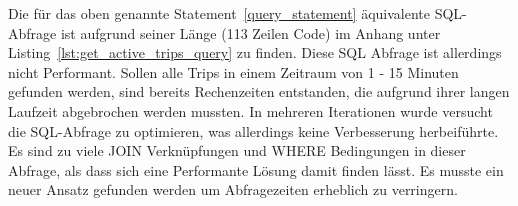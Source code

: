   Die für das oben genannte Statement~\ref{query_statement} äquivalente SQL-Abfrage ist aufgrund seiner Länge (113 Zeilen Code) im Anhang unter Listing~\ref{lst:get_active_trips_query} zu finden. Diese SQL Abfrage ist allerdings nicht Performant. Sollen alle Trips in einem Zeitraum von 1 - 15 Minuten gefunden werden, sind bereits Rechenzeiten entstanden, die aufgrund ihrer langen Laufzeit abgebrochen werden mussten. In mehreren Iterationen wurde versucht die SQL-Abfrage zu optimieren, was allerdings keine Verbesserung herbeiführte. Es sind zu viele JOIN Verknüpfungen und WHERE Bedingungen in dieser Abfrage, als dass sich eine Performante Lösung damit finden lässt. Es musste ein neuer Ansatz gefunden werden um Abfragezeiten erheblich zu verringern.

